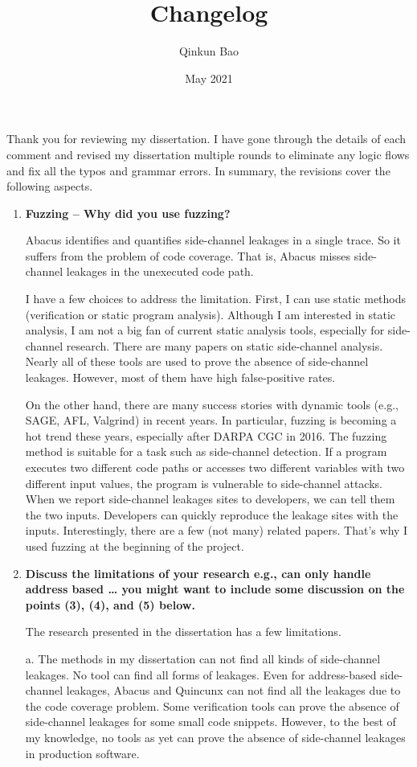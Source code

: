 \documentclass{article}
\title{Changelog}
\author{Qinkun Bao}
\date{May 2021}
\begin{document}
\maketitle
Thank you for reviewing my dissertation. I have gone through the details of each comment and revised my dissertation multiple rounds to eliminate any logic flows and fix all the typos and grammar errors. In summary, the revisions cover the following aspects.


\begin{enumerate}
\item \textbf{Fuzzing – Why did you use fuzzing?}

Abacus identifies and quantifies side-channel leakages in a single trace. So it suffers from the problem of code coverage.  That is, Abacus misses side-channel leakages in the unexecuted code path. 

I have a few choices to address the limitation. First, I can use static methods (verification or static program analysis). Although I am interested in static analysis, I am not a big fan of current static analysis tools, especially for side-channel research. There are many papers on static side-channel analysis. Nearly all of these tools are used to prove the absence of side-channel leakages. However, most of them have high false-positive rates. 

On the other hand, there are many success stories with dynamic tools (e.g., SAGE, AFL, Valgrind) in recent years. In particular, fuzzing is becoming a hot trend these years, especially after DARPA CGC in 2016. The fuzzing method is suitable for a task such as side-channel detection. If a program executes two different code paths or accesses two different variables with two different input values, the program is vulnerable to side-channel attacks. When we report side-channel leakages sites to developers, we can tell them the two inputs. Developers can quickly reproduce the leakage sites with the inputs.  Interestingly, there are a few (not many) related papers. That's why I used fuzzing at the beginning of the project.


\item \textbf{Discuss the limitations of your research
e.g., can only handle address based …
you might want to include some discussion on the points (3), (4), and (5) below.}

The research presented in the dissertation has a few limitations.

a. The methods in my dissertation can not find all kinds of side-channel leakages. No tool can find all forms of leakages. Even for address-based side-channel leakages, Abacus and Quincunx can not find all the leakages due to the code coverage problem. Some verification tools can prove the absence of side-channel leakages for some small code snippets. However, to the best of my knowledge, no tools as yet can prove the absence of side-channel leakages in production software.


\end{enumerate}
\end{document}
